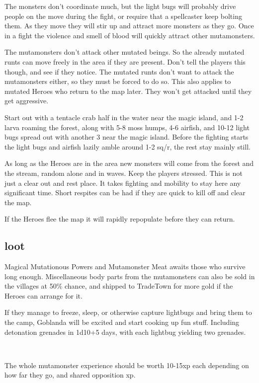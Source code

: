 The monsters don't coordinate much, but the light bugs will probably drive people on the move during the fight, or require that a spellcaster keep bolting them. As they move they will stir up and attract more monsters as they go. Once in a fight the violence and smell of blood will quickly attract other mutamonsters.

The mutamonsters don't attack other mutated beings. So the already mutated runts can move freely in the area if they are present. Don't tell the players this though, and see if they notice. The mutated runts don't want to attack the mutamonsters either, so they must be forced to do so. This also applies to mutated Heroes who return to the map later. They won't get attacked until they get aggressive.

Start out with a tentacle crab half in the water near the magic island, and 1-2 larva roaming the forest, along with 5-8 moss humps, 4-6 airfish, and 10-12 light bugs spread out with another 3 near the magic island.
Before the fighting starts the light bugs and airfish lazily amble around 1-2 sq/r, the rest stay mainly still.

As long as the Heroes are in the area new monsters will come from the forest and the stream, random alone and in waves. Keep the players stressed. This is not just a clear out and rest place. It takes fighting and mobility to stay here any significant time. Short respites can be had if they are quick to kill off and clear the map.

If the Heroes flee the map it will rapidly repopulate before they can return.


\subsection*{loot}
Magical Mutationous Powers and Mutamonster Meat awaits those who survive long enough. Miscellaneous body parts from the mutamonsters can also be sold in the villages at 50\% chance, and shipped to TradeTown for more gold if the Heroes can arrange for it.

If they manage to freeze, sleep, or otherwise capture lightbugs and bring them to the camp, Goblanda will be excited and start cooking up fun stuff. Including detonation grenades in 1d10+5 days, with each lightbug yielding two grenades.

\

The whole mutamonster experience should be worth 10-15xp each depending on how far they go, and shared opposition xp.


